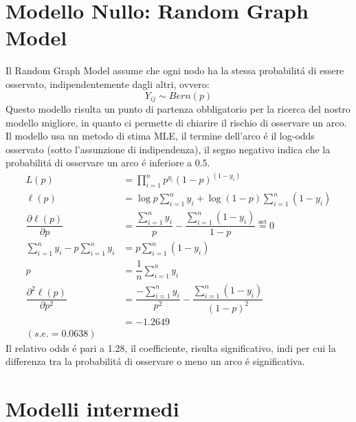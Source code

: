 \documentclass[11pt,a4paper]{report}
\begin{document}
\section{Modello Nullo: Random Graph Model}
Il Random Graph Model assume che ogni nodo ha la stessa probabilit\'a di essere osservato, indipendentemente dagli altri, ovvero:
$$ Y_{ij} \sim Bern(p) $$
Questo modello risulta un punto di partenza obbligatorio per la ricerca del nostro modello migliore, in quanto ci permette di chiarire il rischio di osservare un arco.
\\
Il modello usa un metodo di stima MLE, il termine dell'arco \'e il log-odds osservato (sotto l'assunzione di indipendenza), il segno negativo indica che la probabilit\'a di osservare un arco \'e inferiore a 0.5. 
\\
\begin{align*}
L(p) &= \prod_{i=1}^n p^{y_i}(1-p)^{(1-y_i)}\\
\ell(p) &= \log{p}\sum_{i=1}^n y_i + \log{(1-p)}\sum_{i=1}^n (1-y_i)\\
\dfrac{\partial\ell(p)}{\partial p} &= \dfrac{\sum_{i=1}^n y_i}{p} - \dfrac{\sum_{i=1}^n (1-y_i)}{1-p} \overset{\text{set}}{=}0\\
\sum_{i=1}^n y_i - p\sum_{i=1}^n y_i &= p\sum_{i=1}^n (1-y_i)\\
p& = \dfrac{1}{n}\sum_{i=1}^n y_i\\
\dfrac{\partial^2 \ell(p)}{\partial p^2} &= \dfrac{-\sum_{i=1}^n y_i}{p^2} - \dfrac{\sum_{i=1}^n (1-y_i)}{(1-p)^2}\\
&=-1.2649\\
(s.e. = 0.0638) 
\end{align*}
Il relativo odds \'e pari a 1.28, il coefficiente, risulta significativo, indi per cui la differenza tra la probabilit\'a di osservare o meno un arco \'e significativa.
\section{Modelli intermedi}
\end{document}
